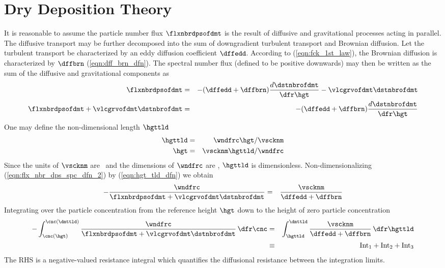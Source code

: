 \documentclass[12pt,twoside]{book}
\begin{document}
\section[Dry Deposition Theory]{Dry Deposition Theory}\label{sxn:ddp_thr}
It is reasonable to assume the particle number flux $\flxnbrdpsofdmt$
is the result of diffusive and gravitational processes acting in
parallel. 
The diffusive transport may be further decomposed into the sum of
downgradient turbulent transport and Brownian diffusion. 
Let the turbulent transport be characterized by an eddy diffusion
coefficient $\dffedd$.
According to  (\ref{eqn:fck_1st_law}), the
Brownian diffusion is characterized by $\dffbrn$
(\ref{eqn:dff_brn_dfn}). 
The spectral number flux (defined to be positive downwards) may then 
be written as the sum of the diffusive and gravitational components as
\begin{eqnarray}
\label{eqn:flx_nbr_dps_spc_dfn_2}
\flxnbrdpsofdmt & = & - ( \dffedd + \dffbrn ) 
\frac{d \dstnbrofdmt}{\dfr\hgt } - \vlcgrvofdmt \dstnbrofdmt \\
\flxnbrdpsofdmt + \vlcgrvofdmt \dstnbrofdmt & = & 
- ( \dffedd + \dffbrn ) \frac{d \dstnbrofdmt}{\dfr\hgt } \nonumber \\
\end{eqnarray}
One may define the non-dimensional length $\hgttld$
\begin{eqnarray}
\hgttld & = & \wndfrc \hgt / \vscknm \nonumber \\
\hgt & = & \vscknm \hgttld / \wndfrc
\label{eqn:hgt_tld_dfn}
\end{eqnarray}
Since the units of $\vscknm$ are \mSxs\ and the dimensions of
$\wndfrc$ are \mxs, $\hgttld$ is dimensionless.
Non-dimensionalizing (\ref{eqn:flx_nbr_dps_spc_dfn_2}) by
(\ref{eqn:hgt_tld_dfn}) we obtain
\begin{eqnarray}
\label{eqn:non_dmn_dfn}
- \frac{\wndfrc}{\flxnbrdpsofdmt + \vlcgrvofdmt \dstnbrofdmt } & = & 
\frac{\vscknm}{\dffedd + \dffbrn }
\end{eqnarray}
Integrating over the particle concentration from the reference
height $\hgt$ down to the height of zero particle concentration 
\begin{eqnarray}
- \int_{\cnc(\hgt)}^{\cnc(\dmttld)}
\frac{\wndfrc}{\flxnbrdpsofdmt + \vlcgrvofdmt \dstnbrofdmt } \,\dfr\cnc
& = & 
\int_{\hgttld}^{\dmttld}
\frac{\vscknm}{\dffedd + \dffbrn } \,\dfr\hgttld \\
& \equiv & 
\mbox{Int}_{1} + \mbox{Int}_{2} + \mbox{Int}_{3} \nonumber
\end{eqnarray}
The RHS is a negative-valued resistance integral which quantifies the
diffusional resistance between the integration limits.
\end{document}
